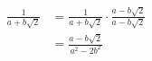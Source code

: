 \documentclass[preview]{standalone}
\begin{document}
\begin{center}
\begin{align*}\frac{1}{a + b\sqrt{2}} &= \frac{1}{a + b\sqrt{2}} \cdot \frac{a - b\sqrt{2}}{a - b\sqrt{2}} \\ &= \frac{a - b\sqrt{2}}{a^2 - 2b^2}\end{align*}
\end{center}
\end{document}
